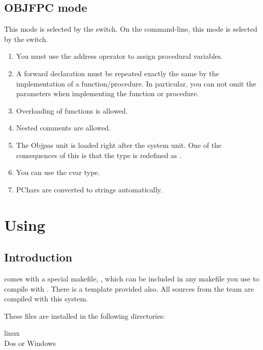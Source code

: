 \documentclass{report}
\begin{document}
\section{OBJFPC mode}
This mode is selected by the  switch. On the command-line,
this mode is selected by the  switch.
\begin{enumerate}
\item You must use the address operator to assign procedural variables.
\item A forward declaration must be repeated exactly the same by the
implementation of a function/procedure. In particular, you can not omit the
parameters when implementing the function or procedure.
\item Overloading of functions is allowed.
\item Nested comments are allowed.
\item The Objpas unit is loaded right after the system unit. One of the
consequences of this is that the type  is redefined as
.
\item You can use the cvar type.
\item PChars are converted to strings automatically.
\end{enumerate}


\chapter{Using }
\label{ch:makefile}
\newcommand{\mvar}[1]{\var{\$(#1)}}

\section{Introduction}
\fpc comes with a special makefile, , which can be
included in any makefile you use to compile with \fpc. There is a template
 provided also. All sources from the \fpc team are compiled
with this system.

These files are installed in the following directories:
\begin{description}
\item[linux]
\item[Dos or Windows]
\end{description}
\end{document}
